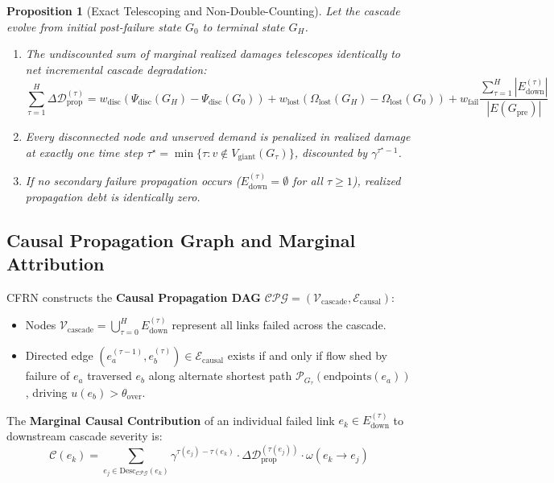 \documentclass[pdflatex,sn-mathphys-num]{sn-jnl}
\theoremstyle{thmstyleone}
\newtheorem{proposition}[theorem]{Proposition}
\theoremstyle{thmstyletwo}
\theoremstyle{thmstylethree}
\begin{document}
\begin{proposition}[Exact Telescoping and Non-Double-Counting]
Let the cascade evolve from initial post-failure state $G_0$ to terminal state $G_H$.
\begin{enumerate}
    \item The undiscounted sum of marginal realized damages telescopes identically to net incremental cascade degradation:
    \begin{equation}
    \sum_{\tau=1}^H \Delta \mathcal{D}_{\mathrm{prop}}^{(\tau)} = w_{\mathrm{disc}} (\Psi_{\mathrm{disc}}(G_H) - \Psi_{\mathrm{disc}}(G_0)) + w_{\mathrm{lost}} (\Omega_{\mathrm{lost}}(G_H) - \Omega_{\mathrm{lost}}(G_0)) + w_{\mathrm{fail}} \frac{\sum_{\tau=1}^H |E_{\mathrm{down}}^{(\tau)}|}{|E(G_{\mathrm{pre}})|}
    \end{equation}
    \item Every disconnected node and unserved demand is penalized in realized damage at exactly one time step $\tau^\star = \min \{ \tau : v \notin V_{\mathrm{giant}}(G_\tau) \}$, discounted by $\gamma^{\tau^\star - 1}$.
    \item If no secondary failure propagation occurs ($E_{\mathrm{down}}^{(\tau)} = \emptyset$ for all $\tau \ge 1$), realized propagation debt is identically zero.
\end{enumerate}
\end{proposition}

\subsection{Causal Propagation Graph and Marginal Attribution}
CFRN constructs the \textbf{Causal Propagation DAG} $\mathcal{CPG} = (\mathcal{V}_{\mathrm{cascade}}, \mathcal{E}_{\mathrm{causal}})$:
\begin{itemize}
    \item Nodes $\mathcal{V}_{\mathrm{cascade}} = \bigcup_{\tau=0}^H E_{\mathrm{down}}^{(\tau)}$ represent all links failed across the cascade.
    \item Directed edge $(e_a^{(\tau-1)}, e_b^{(\tau)}) \in \mathcal{E}_{\mathrm{causal}}$ exists if and only if flow shed by failure of $e_a$ traversed $e_b$ along alternate shortest path $\mathcal{P}_{G_\tau}(\mathrm{endpoints}(e_a))$, driving $u(e_b) > \theta_{\mathrm{over}}$.
\end{itemize}

The \textbf{Marginal Causal Contribution} of an individual failed link $e_k \in E_{\mathrm{down}}^{(\tau)}$ to downstream cascade severity is:
\begin{equation}
\mathcal{C}(e_k) = \sum_{e_j \in \mathrm{Desc}_{\mathcal{CPG}}(e_k)} \gamma^{\tau(e_j) - \tau(e_k)} \cdot \Delta \mathcal{D}_{\mathrm{prop}}^{(\tau(e_j))} \cdot \omega(e_k \to e_j)
\end{equation}
\end{document}
